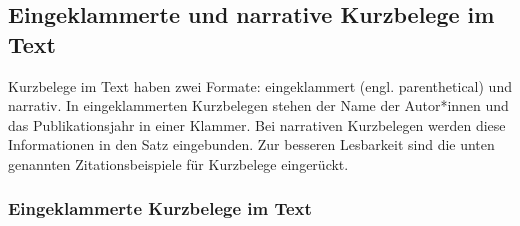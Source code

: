 \documentclass[
  letterpaper,
  DIV=11]{scrreprt}
\begin{document}
\hypertarget{eingeklammerte-und-narrative-kurzbelege-im-text}{%
\subsection{Eingeklammerte und narrative Kurzbelege im
Text}\label{eingeklammerte-und-narrative-kurzbelege-im-text}}

Kurzbelege im Text haben zwei Formate: eingeklammert (engl.
parenthetical) und narrativ. In eingeklammerten Kurzbelegen stehen der
Name der Autor*innen und das Publikationsjahr in einer Klammer. Bei
narrativen Kurzbelegen werden diese Informationen in den Satz
eingebunden. Zur besseren Lesbarkeit sind die unten genannten
Zitationsbeispiele für Kurzbelege eingerückt.

\hypertarget{eingeklammerte-kurzbelege-im-text}{%
\subsubsection{Eingeklammerte Kurzbelege im
Text}\label{eingeklammerte-kurzbelege-im-text}}
\end{document}
